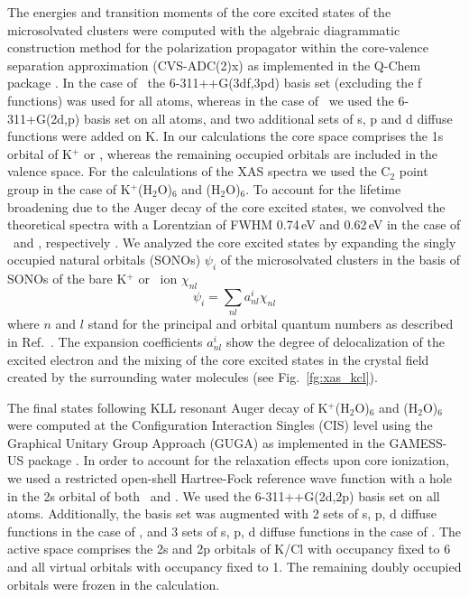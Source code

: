 The energies and transition moments of the core excited states of the microsolvated clusters were computed with the algebraic diagrammatic construction method for the polarization propagator \citep{sch82:2395} within the core-valence separation approximation \citep{bar85:867,ced80:206,ced81:1038} (CVS-ADC(2)x) as implemented in the Q-Chem package \citep{Wenzel14:1900,Wenzel14:4583,Wormit14:774,QChem2015}. In the case of \cli~the 6-311++G(3df,3pd) basis set \citep{Krishnan80:650,McLean80:5639} (excluding the f functions) was used for all atoms, whereas in the case of \ki~we used the 6-311+G(2d,p) basis set \citep{Krishnan80:650,Blaudeau97:5016} on all atoms, and two additional sets of s, p and d diffuse functions were added on K. In our calculations the core space comprises the 1s orbital of K$^{+}$ or \cli, whereas the remaining occupied orbitals are included in the valence space. For the calculations of the XAS spectra we used the C$_2$ point group in the case of K$^{+}$(H$_2$O)$_6$ and \cli(H$_2$O)$_6$. To account for the lifetime broadening due to the Auger decay of the core excited states, we convolved the theoretical spectra with a Lorentzian of FWHM 0.74\,eV and 0.62\,eV in the case of \ki~and \cli, respectively \citep{Krause79:329}. We analyzed the core excited states by expanding the singly occupied natural orbitals (SONOs) $\psi_{i}$ of the microsolvated clusters in the basis of SONOs of the bare K$^{+}$ or \cli~ion $\chi_{nl}$
%
\begin{equation}\label{eq:sono_proj}
\psi_{i} = \sum_{nl} a^{i}_{nl} \chi_{nl}
\end{equation}
%
where $n$ and $l$ stand for the principal and orbital quantum numbers as described in Ref.\ \citep{miteva16:16671}. The expansion coefficients $a^{i}_{nl}$ show the degree of delocalization of the excited electron and the mixing of the core excited states in the crystal field created by the surrounding water molecules (see Fig.\ \ref{fg:xas_kcl}).


The final states following KLL resonant Auger decay of K$^{+}$(H$_2$O)$_6$ and \cli(H$_2$O)$_6$ were computed at the Configuration Interaction Singles (CIS) level using the Graphical Unitary Group Approach (GUGA) as implemented in the GAMESS-US package \citep{GUGA_PhysScr_21,GUGA_JCP_70,GUS}. In order to account for the relaxation effects upon core ionization, we used a restricted open-shell Hartree-Fock reference wave function with a hole in the 2s orbital of both \ki~and \cli.  We used the 6-311++G(2d,2p) basis set \citep{Krishnan80:650,McLean80:5639,Blaudeau97:5016} on all atoms. Additionally, the basis set was augmented with 2 sets of s, p, d diffuse functions in the case of \ki, and 3 sets of s, p, d diffuse functions in the case of \cli. The active space comprises the 2s and 2p orbitals of K/Cl with occupancy fixed to 6 and all virtual orbitals with occupancy fixed to 1. The remaining doubly occupied orbitals were frozen in the calculation. \citep{mosnier16:061401}